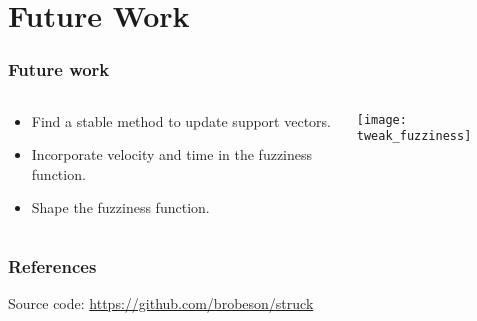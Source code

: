 \section{Future Work}

\begin{frame}
    \frametitle{Future work}
    \begin{columns}[T]
        \begin{column}{0.5\textwidth}
            \begin{itemize}
                \item \alert{Find a stable method to update support vectors.}
                \item Incorporate velocity and time in the fuzziness function.
                \item Shape the fuzziness function.
            \end{itemize}
        \end{column}
        \begin{column}{0.5\textwidth}
            \texttt{[image: tweak\_fuzziness]}
        \end{column}
    \end{columns}
\end{frame}

\begin{frame}
    \frametitle{References}
    \nocite{*}
    
    

    Source code: \url{https://github.com/brobeson/struck}
\end{frame}
